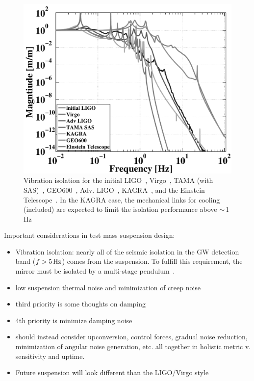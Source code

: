 \begin{figure}[h]
\centering
\includegraphics[width=\columnwidth]{Figures/SeismicIsolations-BW.pdf}
\caption{Vibration isolation for the initial LIGO~\cite{ponslet:432, Giaime:1996},
        Virgo~\cite{Stefano:2001, Virgo:SA2010, Accadia:2011jh},
        TAMA (with SAS)~\cite{Szabi:TAMASAS},
        GEO600~\cite{Hartmut:PhD, Ken:GEOseismic, plissi:3055},
        Adv. LIGO~\cite{aLIGO:Seismic2002},
        KAGRA~\cite{Somiya:2011tb}, and the
        Einstein Telescope~\cite{ET2011}. In the KAGRA case,
      the mechanical links for cooling (included) are expected to limit the
      isolation performance above $\sim$\,1\,Hz~\cite{Takahashi:email}}
\label{fig:SeismicTFs}
\end{figure}


Important considerations in test mass suspension design\cite{SUS:2012, Aston:2012}:
\begin{itemize}
   \item Vibration isolation: nearly all of the seismic isolation in the GW detection band ($f > 5\,\rm Hz$)
     comes from the suspension. To fulfill this requirement, the mirror must be isolated by a
     multi-stage pendulum~\cite{Beker:2011}.
   \item low suspension thermal noise and minimization of creep noise~\cite{Levin:2012ek, Gretarsson:2005gs}
   \item third priority is some thoughts on damping
   \item 4th priority is minimize damping noise
   \item should instead consider upconversion, control forces, gradual noise
      reduction, minimization of angular noise generation, etc. all together in
      holistic metric v. sensitivity and uptime.
   \item Future suspension will look different than the LIGO/Virgo style
\end{itemize}

